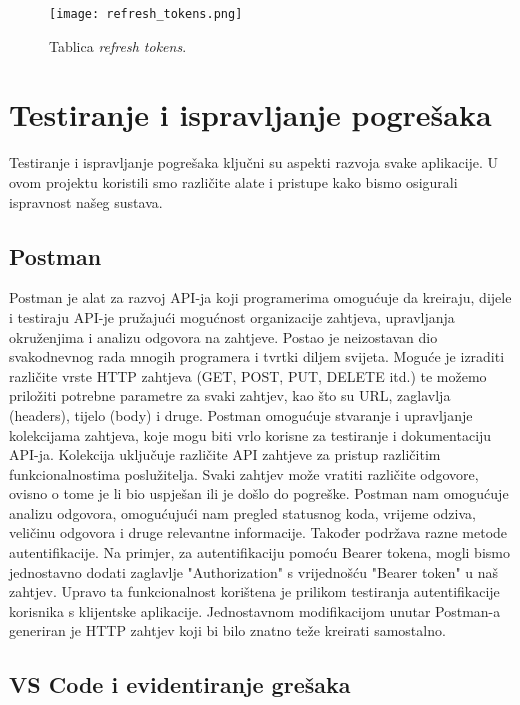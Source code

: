 \documentclass[times, utf8, zavrsni]{fer}
\begin{document}
\begin{figure}[h]
\centering
\texttt{[image: refresh\_tokens.png]}
\caption{Tablica \textit{refresh tokens}.}
\end{figure}

\newpage
\section{Testiranje i ispravljanje pogrešaka}

Testiranje i ispravljanje pogrešaka ključni su aspekti razvoja svake aplikacije. U ovom projektu koristili smo različite alate i pristupe kako bismo osigurali ispravnost našeg sustava.

\subsection{Postman}

Postman\cite{postman} je alat za razvoj API-ja koji programerima omogućuje da kreiraju, dijele i  testiraju API-je pružajući mogućnost organizacije zahtjeva, upravljanja okruženjima i analizu odgovora na zahtjeve. Postao je neizostavan dio svakodnevnog rada mnogih programera i tvrtki diljem svijeta. Moguće je izraditi različite vrste HTTP zahtjeva (GET, POST, PUT, DELETE itd.) te možemo priložiti potrebne parametre za svaki zahtjev, kao što su URL, zaglavlja (headers), tijelo (body) i druge. Postman omogućuje stvaranje i upravljanje kolekcijama zahtjeva, koje mogu biti vrlo korisne za testiranje i dokumentaciju API-ja. Kolekcija uključuje različite API zahtjeve za pristup različitim funkcionalnostima poslužitelja. Svaki zahtjev može vratiti različite odgovore, ovisno o tome je li bio uspješan ili je došlo do pogreške. Postman nam omogućuje analizu odgovora, omogućujući nam pregled statusnog koda, vrijeme odziva, veličinu odgovora i druge relevantne informacije. Također podržava razne metode autentifikacije. Na primjer, za autentifikaciju pomoću Bearer tokena, mogli bismo jednostavno dodati zaglavlje "Authorization" s vrijednošću "Bearer {token}" u naš zahtjev. Upravo ta funkcionalnost korištena je prilikom testiranja autentifikacije korisnika s klijentske aplikacije. Jednostavnom modifikacijom unutar Postman-a generiran je HTTP zahtjev koji bi bilo znatno teže kreirati samostalno.

\subsection{VS Code i evidentiranje grešaka}
\end{document}
